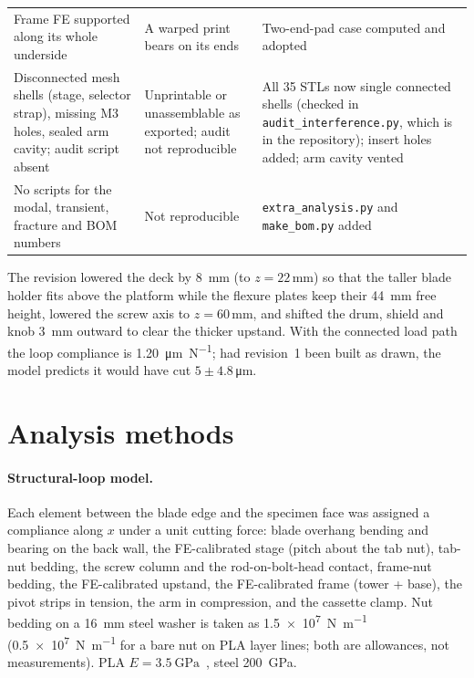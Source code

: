 \documentclass[11pt,a4paper]{article}
\begin{document}
\begin{table}[!htbp]
\begin{tabularx}{\linewidth}{@{}p{3.6cm}XX@{}}
Frame FE supported along its whole underside & A warped print bears on its ends & Two-end-pad case computed and adopted \\
Disconnected mesh shells (stage, selector strap), missing M3 holes, sealed arm cavity; audit script absent & Unprintable or unassemblable as exported; audit not reproducible & All 35 STLs now single connected shells (checked in \texttt{audit\_interference.py}, which is in the repository); insert holes added; arm cavity vented \\
No scripts for the modal, transient, fracture and BOM numbers & Not reproducible & \texttt{extra\_analysis.py} and \texttt{make\_bom.py} added \\
\bottomrule
\end{tabularx}
\end{table}

The revision lowered the deck by \SI{8}{\milli\metre} (to $z=22$\,mm) so that the taller blade holder fits above the platform while the flexure plates keep their \SI{44}{\milli\metre} free height, lowered the screw axis to $z=60$\,mm, and shifted the drum, shield and knob \SI{3}{\milli\metre} outward to clear the thicker upstand. With the connected load path the loop compliance is \SI{1.20}{\micro\metre\per\newton}; had revision~1 been built as drawn, the model predicts it would have cut $5\pm4.8$\,\si{\micro\metre}.

\FloatBarrier
\section{Analysis methods}
\paragraph{Structural-loop model.} Each element between the blade edge and the specimen face was assigned a compliance along $x$ under a unit cutting force: blade overhang bending and bearing on the back wall, the FE-calibrated stage (pitch about the tab nut), tab-nut bedding, the screw column and the rod-on-bolt-head contact, frame-nut bedding, the FE-calibrated upstand, the FE-calibrated frame (tower + base), the pivot strips in tension, the arm in compression, and the cassette clamp. Nut bedding on a \SI{16}{\milli\metre} steel washer is taken as \SI{1.5e7}{\newton\per\metre} (\SI{0.5e7}{\newton\per\metre} for a bare nut on PLA layer lines; both are allowances, not measurements). PLA $E=\SI{3.5}{\giga\pascal}$~\citep{Tymrak2014}, steel \SI{200}{\giga\pascal}.
\end{document}
